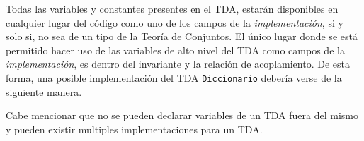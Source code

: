 Todas las variables y constantes presentes en el TDA, estarán disponibles en
cualquier lugar del código como uno de los campos de la
\textit{implementación}, si y solo si, no sea de un tipo de la Teoría de
Conjuntos. El único lugar donde se está permitido hacer uso de las variables
de alto nivel del TDA como campos de la \textit{implementación}, es dentro del
invariante y la relación de acoplamiento. De esta forma, una posible
implementación del TDA \texttt{Diccionario} debería verse de la siguiente
manera.


Cabe mencionar que no se pueden declarar variables de un TDA fuera del mismo y
pueden existir multiples implementaciones para un TDA.

